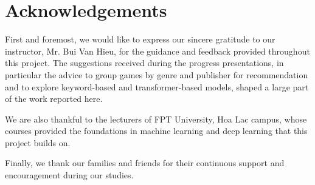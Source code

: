 \chapter*{Acknowledgements}

First and foremost, we would like to express our sincere gratitude to our instructor, Mr. Bui Van Hieu, for the guidance and feedback provided throughout this project. The suggestions received during the progress presentations, in particular the advice to group games by genre and publisher for recommendation and to explore keyword-based and transformer-based models, shaped a large part of the work reported here.

We are also thankful to the lecturers of FPT University, Hoa Lac campus, whose courses provided the foundations in machine learning and deep learning that this project builds on.

Finally, we thank our families and friends for their continuous support and encouragement during our studies.
